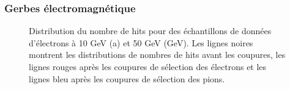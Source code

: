 \subsubsection{Gerbes électromagnétique}
\begin{figure}[!ht]
  \caption{Distribution du nombre de hits pour des échantillons de données d'électrons à 10 GeV (a) et 50 GeV (GeV). Les lignes noires montrent les distributions de nombres de hits avant les coupures, les lignes rouges après les coupures de sélection des électrons et les lignes bleu après les coupures de sélection des pions. \label{fig.e-Selection}}
\end{figure}

